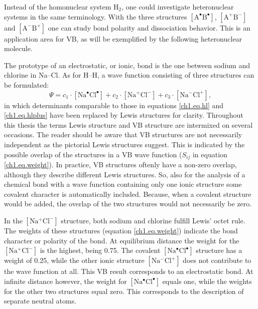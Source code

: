 Instead of the homonuclear system H$_2$, one could investigate heteronuclear systems in the same terminology. With the three structures $\mathrm{[A^\bullet B^\bullet]}$, $\mathrm{[A^{+} B^{-}]}$ and $\mathrm{[A^{-} B^{+}]}$ one can study bond polarity and dissociation behavior. This is an application area for VB, as will be exemplified by the following heteronuclear molecule.

The prototype of an electrostatic, or ionic, bond is the one between sodium and chlorine in \mbox{Na--Cl}. As for H--H, a wave function consisting of three structures can be formulated:
\begin{equation}
\Psi = c_1 \cdot \mathrm{[Na^\bullet Cl^\bullet]} + c_2 \cdot \mathrm{[Na^{+} Cl^{-}]} + c_3 \cdot \mathrm{[Na^{-} Cl^{+}]},
\label{ch1.eq.nacl}
\end{equation}
in which determinants comparable to those in equations \ref{ch1.eq.hl} and \ref{ch1.eq.hlplus} have been replaced by Lewis structures for clarity. Throughout this thesis the terms Lewis structure and VB structure are intermixed on several occasions. The reader should be aware that VB structures are not necessarily independent as the pictorial Lewis structures suggest. This is indicated by the possible overlap of the structures in a VB wave function ($S_{ij}$ in equation \ref{ch1.eq.weight}). In practice, VB structures oftenly have a non-zero overlap, although they describe different Lewis structures. So, also for the analysis of a chemical bond with a wave function containing only one ionic structure some covalent character is automatically included. Because, when a covalent structure would be added, the overlap of the two structures would not necessarily be zero.

In the $\mathrm{[Na^{+} Cl^{-}]}$ structure, both sodium and chlorine fulfill Lewis' octet rule. The weights of these structures (equation \ref{ch1.eq.weight}) indicate the bond character or polarity of the bond. At equilibrium distance the weight for the $\mathrm{[Na^{+} Cl^{-}]}$ is the highest, being 0.75. The covalent $\mathrm{[Na^\bullet Cl^\bullet]}$ structure has a weight of 0.25, while the other ionic structure $\mathrm{[Na^{-} Cl^{+}]}$ does not contribute to the wave function at all. This VB result corresponds to an electrostatic bond. At infinite distance however, the weight for \mbox{$\mathrm{[Na^\bullet Cl^\bullet]}$} equals one, while the weights for the other two structures equal zero. This corresponds to the description of separate neutral atoms.


